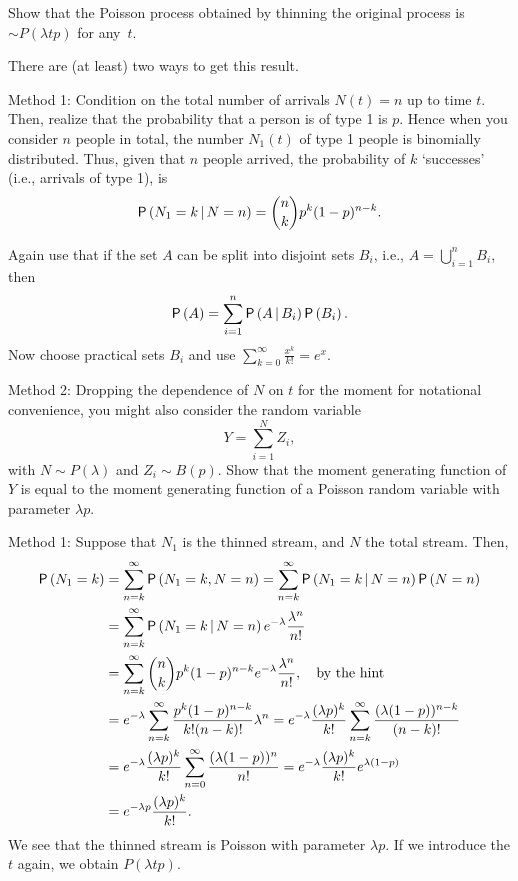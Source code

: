 \begin{exercise}\label{ex:1}
Show that the Poisson process obtained by thinning the original
  process is $\sim P(\lambda t p)$ for any~$t$.
  \begin{hint}
There are (at least) two ways to get this result. 

Method 1:  Condition on the total number of arrivals $N(t)=n$ up to time
      $t$. Then, realize that the probability that a person is of type 1 is $p$. Hence when you consider $n$ people in
      total, the number $N_1(t)$ of type 1 people is binomially distributed. Thus, given that $n$ people arrived, the probability of $k$ `successes' (i.e., arrivals of type 1), is 
      \begin{equation*}
        \P{N_1=k \given N = n} = {n \choose k} p^k (1-p)^{n-k}.
      \end{equation*}

      Again use that if the set $A$ can be split into disjoint sets
      $B_i$, i.e., $A=\bigcup_{i=1}^n B_i$, then
    \begin{equation*}
      \P{A} = \sum_{i=1}^n \P{A\given B_i} \P{B_i}.
    \end{equation*}
Now choose practical sets $B_i$ and use $\sum_{k=0}^{\infty} \frac{x^k}{k!} = e^x$. 

Method 2: Dropping the dependence of $N$ on $t$ for the moment for notational convenience, you might also consider the random variable 
  \begin{equation*}
    Y = \sum_{i=1}^N Z_i,
  \end{equation*}
  with $N\sim P(\lambda)$ and $Z_i\sim B(p)$. Show that the moment
  generating function of $Y$ is equal to the moment generating
  function of a Poisson random variable with parameter $\lambda p$.
  \end{hint}
    \begin{solution}
Method 1: Suppose that  $N_1$ is the  thinned stream, and $N$ the total stream. Then, 
\begin{align*}
    \P{N_1 = k}
&= \sum_{n=k}^\infty \P{N_1 =k, N = n} 
= \sum_{n=k}^\infty \P{N_1 =k\given N = n}\P{N=n} \\
&= \sum_{n=k}^\infty \P{N_1 =k\given N = n}e^{-\lambda} \frac{\lambda^n}{n!}\\
&= \sum_{n=k}^\infty {n \choose k} p^k (1-p)^{n-k} e^{-\lambda} \frac{\lambda^n}{n!}, \quad\text{by the hint}\\
&= e^{-\lambda}\sum_{n=k}^\infty  \frac{p^k (1-p)^{n-k}}{k! (n-k)!} \lambda^n
= e^{-\lambda} \frac{(\lambda p)^k}{k!} \sum_{n=k}^\infty  \frac{(\lambda (1-p))^{n-k}}{(n-k)!}\\
&= e^{-\lambda} \frac{(\lambda p)^k}{k!} \sum_{n=0}^\infty  \frac{(\lambda (1-p))^{n}}{n!}
= e^{-\lambda} \frac{(\lambda p)^k}{k!} e^{\lambda(1-p)} \\
&= e^{-\lambda p} \frac{(\lambda p)^k}{k!}.
\end{align*}
We see that the thinned stream is Poisson with parameter $\lambda p$. If we introduce the $t$ again, we obtain $P(\lambda t p)$.


\end{solution}
\end{exercise}
